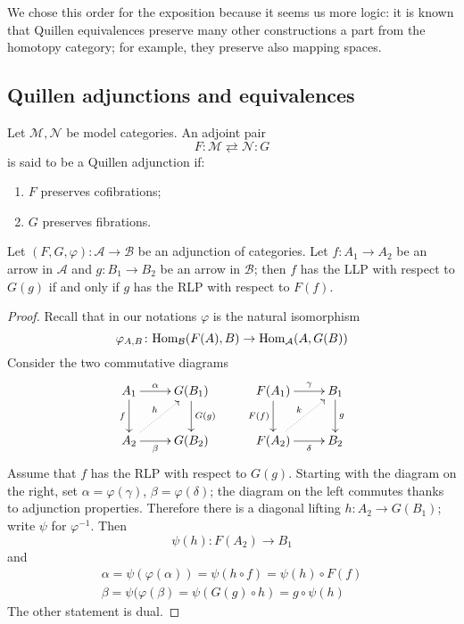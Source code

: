 We chose this order for the exposition because it seems us more logic: it is known that Quillen equivalences preserve many other constructions a part from the homotopy category; for example, they preserve also mapping spaces.

\subsection{Quillen adjunctions and equivalences}

\begin{defin}
Let $\mathcal M, \mathcal N$ be model categories. An adjoint pair
\[
F \colon \mathcal M \rightleftarrows \mathcal N \colon G
\]
is said to be a Quillen adjunction if:
\begin{enumerate}
\item $F$ preserves cofibrations;
\item $G$ preserves fibrations.
\end{enumerate}
\end{defin}

\begin{lemma} \label{lemma adjunction and lifting properties}
Let $(F,G,\varphi) \colon \mathcal A \to \mathcal B$ be an adjunction of categories. Let $f \colon A_1 \to A_2$ be an arrow in $\mathcal A$ and $g \colon B_1 \to B_2$ be an arrow in $\mathcal B$; then $f$ has the LLP with respect to $G(g)$ if and only if $g$ has the RLP with respect to $F(f)$.
\end{lemma}

\begin{proof}
Recall that in our notations $\varphi$ is the natural isomorphism
\[
\varphi_{A,B} \colon \mathrm{Hom}_{\mathcal B}(F(A),B) \to \mathrm{Hom}_{\mathcal A}(A,G(B))
\]
Consider the two commutative diagrams
\[
\xymatrix{
A_1 \ar[d]_f \ar[r]^-\alpha & G(B_1) \ar[d]^{G(g)} \\ A_2 \ar[r]_-{\beta} \ar@{.>}[ur]^h & G(B_2)
} \qquad
\xymatrix{
F(A_1) \ar[d]_{F(f)} \ar[r]^-\gamma & B_1 \ar[d]^g \\ F(A_2) \ar@{.>}[ur]^k \ar[r]_-\delta & B_2
}
\]
Assume that $f$ has the RLP with respect to $G(g)$. Starting with the diagram on the right, set $\alpha = \varphi(\gamma)$, $\beta = \varphi(\delta)$; the diagram on the left commutes thanks to adjunction properties. Therefore there is a diagonal lifting $h \colon A_2 \to G(B_1)$; write $\psi$ for $\varphi^{-1}$. Then
\[
\psi(h) \colon F(A_2) \to B_1
\]
and
\begin{gather*}
\alpha = \psi(\varphi(\alpha)) = \psi(h \circ f) = \psi(h) \circ F(f) \\
\beta = \psi(\varphi(\beta) = \psi(G(g) \circ h) = g \circ \psi(h)
\end{gather*}
The other statement is dual.
\end{proof}

